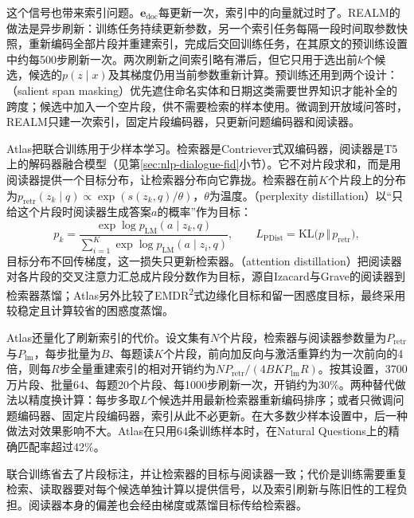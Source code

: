 这个信号也带来索引问题。$\bm e_{\mathrm{doc}}$每更新一次，索引中的向量就过时了。REALM的做法是异步刷新：训练任务持续更新参数，另一个索引任务每隔一段时间取参数快照，重新编码全部片段并重建索引，完成后交回训练任务，在其原文的预训练设置中约每500步刷新一次。两次刷新之间索引略有滞后，但它只用于选出前$k$个候选，候选的$p(z\mid x)$及其梯度仍用当前参数重新计算。预训练还用到两个设计：（salient span masking）优先遮住命名实体和日期这类需要世界知识才能补全的跨度；候选中加入一个空片段，供不需要检索的样本使用。微调到开放域问答时，REALM只建一次索引，固定片段编码器，只更新问题编码器和阅读器。

Atlas把联合训练用于少样本学习。检索器是Contriever式双编码器，阅读器是T5上的解码器融合模型（见第\ref{sec:nlp-dialogue-fid}小节）。它不对片段求和，而是用阅读器提供一个目标分布，让检索器分布向它靠拢。检索器在前$K$个片段上的分布为$p_{\mathrm{retr}}(z_k\mid q)\propto\exp(s(z_k,q)/\theta)$，$\theta$为温度。（perplexity distillation）以“只给这个片段时阅读器生成答案$a$的概率”作为目标：
\begin{equation}
  p_k=\frac{\exp\log p_{\mathrm{LM}}(a\mid z_k,q)}{\sum_{i=1}^{K}\exp\log p_{\mathrm{LM}}(a\mid z_i,q)},\qquad
  L_{\mathrm{PDist}}=\mathrm{KL}\bigl(p\,\Vert\,p_{\mathrm{retr}}\bigr),
  \label{eq:nlp-dialogue-pdist}
\end{equation}
目标分布不回传梯度，这一损失只更新检索器。（attention distillation）把阅读器对各片段的交叉注意力汇总成片段分数作为目标，源自Izacard与Grave的阅读器到检索器蒸馏\cite{nlp-qa-izacard2021distilling}；Atlas另外比较了EMDR\textsuperscript{2}式边缘化目标和留一困惑度目标，最终采用较稳定且计算较省的困惑度蒸馏。

Atlas还量化了刷新索引的代价。设文集有$N$个片段，检索器与阅读器参数量为$P_{\mathrm{retr}}$与$P_{\mathrm{lm}}$，每步批量为$B$、每题读$K$个片段，前向加反向与激活重算约为一次前向的4倍，则每$R$步全量重建索引的相对开销约为$N P_{\mathrm{retr}}/(4BKP_{\mathrm{lm}}R)$。按其设置，3700万片段、批量64、每题20个片段、每1000步刷新一次，开销约为30\%。两种替代做法以精度换计算：每步多取$L$个候选并用最新检索器重新编码排序；或者只微调问题编码器、固定片段编码器，索引从此不必更新。在大多数少样本设置中，后一种做法对效果影响不大。Atlas在只用64条训练样本时，在Natural Questions上的精确匹配率超过42\%。

联合训练省去了片段标注，并让检索器的目标与阅读器一致；代价是训练需要重复检索、读取器要对每个候选单独计算以提供信号，以及索引刷新与陈旧性的工程负担。阅读器本身的偏差也会经由梯度或蒸馏目标传给检索器。


